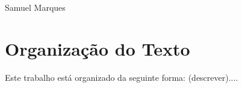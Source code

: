 Samuel Marques

\section{Organização do Texto}

Este trabalho está organizado da seguinte forma: (descrever)....










